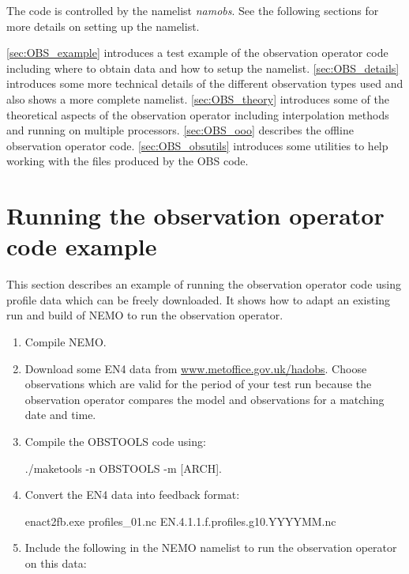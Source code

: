 \documentclass[../tex_main/NEMO_manual]{subfiles}
\begin{document}
The code is controlled by the namelist \textit{namobs}.
See the following sections for more details on setting up the namelist.

\autoref{sec:OBS_example} introduces a test example of the observation operator code including
where to obtain data and how to setup the namelist.
\autoref{sec:OBS_details} introduces some more technical details of the different observation types used and
also shows a more complete namelist.
\autoref{sec:OBS_theory} introduces some of the theoretical aspects of the observation operator including
interpolation methods and running on multiple processors.
\autoref{sec:OBS_ooo} describes the offline observation operator code.
\autoref{sec:OBS_obsutils} introduces some utilities to help working with the files produced by the OBS code.

\section{Running the observation operator code example}
\label{sec:OBS_example}

This section describes an example of running the observation operator code using
profile data which can be freely downloaded.
It shows how to adapt an existing run and build of NEMO to run the observation operator.

\begin{enumerate}
\item Compile NEMO.

\item Download some EN4 data from \href{http://www.metoffice.gov.uk/hadobs}{www.metoffice.gov.uk/hadobs}.
  Choose observations which are valid for the period of your test run because
  the observation operator compares the model and observations for a matching date and time. 

\item Compile the OBSTOOLS code using: 
\begin{cmds}
./maketools -n OBSTOOLS -m [ARCH].
\end{cmds}

\item Convert the EN4 data into feedback format: 
\begin{cmds}
enact2fb.exe profiles_01.nc EN.4.1.1.f.profiles.g10.YYYYMM.nc
\end{cmds}

\item Include the following in the NEMO namelist to run the observation operator on this data:
\end{enumerate}
\end{document}
